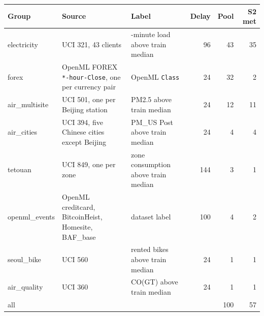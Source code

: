 \begin{tabular}{@{}l >{\raggedright\arraybackslash}p{4.6cm} >{\raggedright\arraybackslash}p{3.4cm} r r r@{}}
\toprule
Group & Source & Label & Delay & Pool & S2 met \\
\midrule
electricity & UCI 321, 43 clients & 15-minute load above train median & 96 & 43 & 35 \\
forex & OpenML FOREX \texttt{*-hour-Close}, one per currency pair & OpenML \texttt{Class} & 24 & 32 & 2 \\
air\_multisite & UCI 501, one per Beijing station & PM2.5 above train median & 24 & 12 & 11 \\
air\_cities & UCI 394, five Chinese cities except Beijing & PM\_US Post above train median & 24 & 4 & 4 \\
tetouan & UCI 849, one per zone & zone consumption above train median & 144 & 3 & 1 \\
openml\_events & OpenML creditcard, BitcoinHeist, Homesite, BAF\_base & dataset label & 100 & 4 & 2 \\
seoul\_bike & UCI 560 & rented bikes above train median & 24 & 1 & 1 \\
air\_quality & UCI 360 & CO(GT) above train median & 24 & 1 & 1 \\
\midrule
all & & & & 100 & 57 \\
\bottomrule
\end{tabular}
